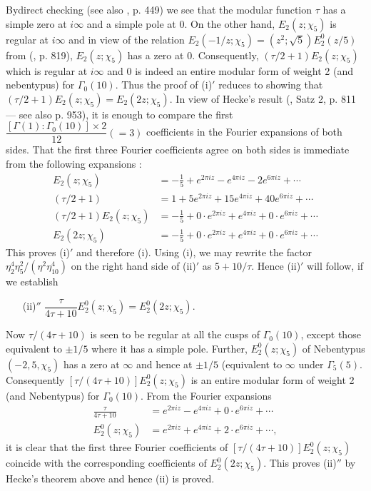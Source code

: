 By\pageoriginale direct checking (see also \cite{art8-key3}, p. 449) we see that the modular function $\tau$ has a simple zero at $i\infty$ and a simple pole at $0$. On the other hand, $E_{2}(z;\chi_{5})$ is regular at $i\infty$ and in view of the relation $E_{2}(-1/z;\chi_{5})=(z^{2};\sqrt{5})E^{0}_{2}(z/5)$ from (\cite{art8-key5}, p. 819), $E_{2}(z;\chi_{5})$ has a zero at $0$. Consequently, $(\tau/2+1)E_{2}(z;\chi_{5})$ which is regular at $i\infty$ and $0$ is indeed an entire modular form of weight 2 (and nebentypus) for $\Gamma_{0}(10)$. Thus the proof of (i)$'$ reduces to showing that $(\tau/2+1)E_{2}(z;\chi_{5})=E_{2}(2z;\chi_{5})$. In view of Hecke's result (\cite{art8-key5}, Satz 2, p. 811 --- see also p. 953), it is enough to compare the first $\dfrac{[\Gamma(1):\Gamma_{0}(10)]\times 2}{12}(=3)$ coefficients in the Fourier expansions of both sides. That the first three Fourier coefficients agree on both sides is immediate from the following expansions :
\begin{align*}
E_{2}(z;\chi_{5}) &= -\frac{1}{5}+e^{2\pi iz}-e^{4\pi iz}-2e^{6\pi iz}+\cdots\\
(\tau/2+1) &= 1+5e^{2\pi iz}+15e^{4\pi iz}+40e^{6\pi iz}+\cdots\\
(\tau/2+1)E_{2}(z;\chi_{5}) &= -\frac{1}{5}+0\cdot e^{2\pi iz}+e^{4\pi iz}+0\cdot e^{6\pi iz}+\cdots\\
E_{2}(2z;\chi_{5}) &= -\frac{1}{5}+0\cdot e^{2\pi iz}+e^{4\pi iz}+0\cdot e^{6\pi iz}+\cdots
\end{align*}
This proves (i)$'$ and therefore (i). Using (i), we may rewrite the factor $\eta^{4}_{2}\eta^{2}_{5}/(\eta^{2}\eta^{4}_{10})$ on the right hand side of (ii)$'$ as $5+10/\tau$. Hence (ii)$'$ will follow, if we establish
\begin{itemize}
\item[(ii)$''$] $\dfrac{\tau}{4\tau+10}E^{0}_{2}(z;\chi_{5})=E^{0}_{2}(2z;\chi_{5})$.
\end{itemize}
Now $\tau/(4\tau+10)$ is seen to be regular at all the cusps of $\Gamma_{0}(10)$, except those equivalent to $\pm 1/5$ where it has a simple pole. Further, $E^{0}_{2}(z;\chi_{5})$ of Nebentypus $(-2,5,\chi_{5})$ has a zero at $\infty$ and hence at $\pm 1/5$ (equivalent to $\infty$ under $\Gamma_{5}(5)$. Consequently $[\tau/(4\tau+10)]E^{0}_{2}(z;\chi_{5})$ is an entire modular form of weight 2 (and Nebentypus) for $\Gamma_{0}(10)$. From the Fourier expansions
\begin{align*}
\frac{\tau}{4\tau+10} &= e^{2\pi iz}-e^{4\pi iz}+0\cdot e^{6\pi iz}+\cdots\\
E^{0}_{2}(z;\chi_{5}) &= e^{2\pi iz}+e^{4\pi iz}+2\cdot e^{6\pi iz}+\cdots,
\end{align*}
it is clear that the first three Fourier coefficients of $[\tau/(4\tau+10)]E^{0}_{2}(z;\chi_{5})$ coincide with the corresponding coefficients of $E^{0}_{2}(2z;\chi_{5})$. This proves (ii)$''$ by Hecke's theorem above and hence (ii) is proved.

